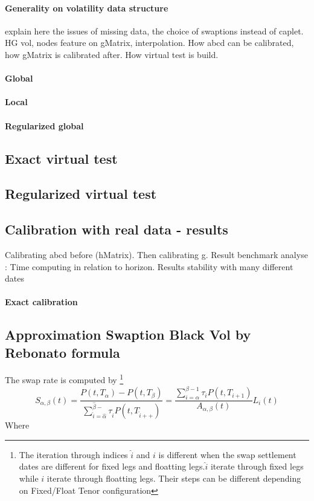 \documentclass[a4paper,10pt]{article}
\newcommand{\Ptii}{P(t,T_{i+1})}
\newcommand{\Lit}{L_{i}(t)}
\begin{document}
\paragraph{Generality on volatility data structure}
explain here the issues of missing data, the choice of swaptions instead of caplet. HG vol, nodes feature on gMatrix, interpolation. How abcd can be calibrated, how gMatrix is calibrated after. How virtual test is build.
\paragraph{Global}
\paragraph{Local}
\paragraph{Regularized global}

\subsection{Exact virtual test}
\subsection{Regularized virtual test}
\subsection{Calibration with real data - results}
Calibrating abcd before (hMatrix). Then calibrating g. Result benchmark analyse : Time computing in relation to horizon. Results stability with many different dates
\paragraph{Exact calibration}

\subsection{Approximation Swaption Black Vol by Rebonato formula}
The swap rate is computed by \footnote{The iteration through indices $\hat{i}$ and $i$ is different when the swap settlement dates are different for fixed legs and floatting legs.$\hat{i}$ iterate through fixed legs while $i$ iterate through floatting legs. Their steps can be different depending on Fixed/Float Tenor configuration}
\[
S_{\alpha,\beta}(t) 
= 
\frac{P(t,T_{\alpha})-P(t,T_{\beta})}{\sum^{\hat{\beta}-}_{\hat{i}=\hat{\alpha}}\tau_{\hat{i}}P(t,T_{\hat{i}++})} 
=
\frac{\sum^{\beta-1}_{i=\alpha} \tau_i \Ptii }{A_{\alpha,\beta}(t)} \Lit 
\]
Where 
\end{document}
